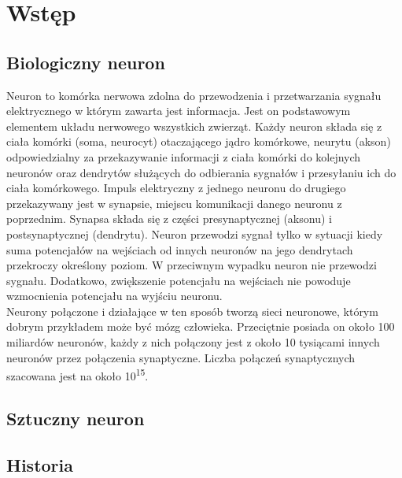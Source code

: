 
\chapter {Wstęp}

\section {Biologiczny neuron}

Neuron to komórka nerwowa zdolna do przewodzenia i przetwarzania sygnału elektrycznego w którym zawarta jest informacja. Jest on podstawowym elementem układu nerwowego wszystkich zwierząt. Każdy neuron składa się z ciała komórki (soma, neurocyt) otaczającego jądro komórkowe, neurytu (akson) odpowiedzialny za przekazywanie informacji z ciała komórki do kolejnych neuronów oraz dendrytów służących do odbierania sygnałów i przesyłaniu ich do ciała komórkowego. Impuls elektryczny z jednego neuronu do drugiego przekazywany jest w synapsie, miejscu komunikacji danego neuronu z poprzednim. Synapsa składa się z części presynaptycznej (aksonu) i postsynaptycznej (dendrytu). Neuron przewodzi sygnał tylko w sytuacji kiedy suma potencjałów na wejściach od innych neuronów na jego dendrytach przekroczy określony poziom. W przeciwnym wypadku neuron nie przewodzi sygnału. Dodatkowo, zwiększenie potencjału na wejściach nie powoduje wzmocnienia potencjału na wyjściu neuronu. \\
Neurony połączone i działające w ten sposób tworzą sieci neuronowe, którym dobrym przykładem może być mózg człowieka.  Przeciętnie posiada on około 100 miliardów neuronów, każdy z nich połączony jest z około 10 tysiącami innych neuronów przez połączenia synaptyczne. Liczba połączeń synaptycznych szacowana jest na około 10\textsuperscript{15}.

\section {Sztuczny neuron}

\section {Historia}